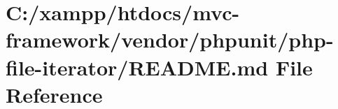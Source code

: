 \hypertarget{vendor_2phpunit_2php-file-iterator_2_r_e_a_d_m_e_8md}{}\section{C\+:/xampp/htdocs/mvc-\/framework/vendor/phpunit/php-\/file-\/iterator/\+R\+E\+A\+D\+ME.md File Reference}
\label{vendor_2phpunit_2php-file-iterator_2_r_e_a_d_m_e_8md}
